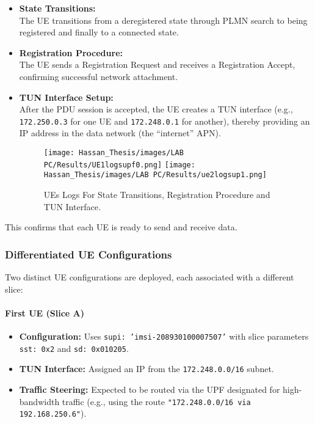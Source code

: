\begin{itemize}
    \item \textbf{State Transitions:}\\
    The UE transitions from a deregistered state through PLMN search to being 
    registered and finally to a connected state.

    \item \textbf{Registration Procedure:}\\
    The UE sends a Registration Request and receives a Registration Accept, 
    confirming successful network attachment.

    \item \textbf{TUN Interface Setup:}\\
    After the PDU session is accepted, the UE creates a TUN interface 
    (e.g., \texttt{172.250.0.3} for one UE and \texttt{172.248.0.1} for another), 
    thereby providing an IP address in the data network (the “internet” APN).

    \begin{figure}[H]
        \centering
          \texttt{[image: Hassan\_Thesis/images/LAB PC/Results/UE1logsupf0.png]}
            \texttt{[image: Hassan\_Thesis/images/LAB PC/Results/ue2logsup1.png]}
        \caption{UEs Logs For State Transitions, Registration Procedure and TUN Interface.}
        \label{fig:ue-log-screenshot}
    \end{figure}
\end{itemize}

This confirms that each UE is ready to send and receive data.

\subsubsection{Differentiated UE Configurations}
\label{subsec:ue-configurations}

Two distinct UE configurations are deployed, each associated with a different slice:

\paragraph{First UE (Slice A)}
\begin{itemize}
    \item \textbf{Configuration:} Uses \texttt{supi: 'imsi-208930100007507'} with 
    slice parameters \texttt{sst: 0x2} and \texttt{sd: 0x010205}.
    \item \textbf{TUN Interface:} Assigned an IP from the \texttt{172.248.0.0/16} subnet.
    \item \textbf{Traffic Steering:} Expected to be routed via the UPF designated 
    for high-bandwidth traffic (e.g., using the route 
    \texttt{"172.248.0.0/16 via 192.168.250.6"}).

\end{itemize}

